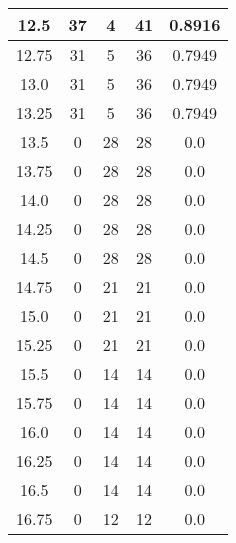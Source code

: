 \documentclass[letterpaper, 12pt]{article}
\begin{document}
\begin{longtable}{|c|c|c|c|c|}
12.5 & 37 & 4 & 41 & 0.8916 \\
\hline
12.75 & 31 & 5 & 36 & 0.7949 \\
\hline
13.0 & 31 & 5 & 36 & 0.7949 \\
\hline
13.25 & 31 & 5 & 36 & 0.7949 \\
\hline
13.5 & 0 & 28 & 28 & 0.0 \\
\hline
13.75 & 0 & 28 & 28 & 0.0 \\
\hline
14.0 & 0 & 28 & 28 & 0.0 \\
\hline
14.25 & 0 & 28 & 28 & 0.0 \\
\hline
14.5 & 0 & 28 & 28 & 0.0 \\
\hline
14.75 & 0 & 21 & 21 & 0.0 \\
\hline
15.0 & 0 & 21 & 21 & 0.0 \\
\hline
15.25 & 0 & 21 & 21 & 0.0 \\
\hline
15.5 & 0 & 14 & 14 & 0.0 \\
\hline
15.75 & 0 & 14 & 14 & 0.0 \\
\hline
16.0 & 0 & 14 & 14 & 0.0 \\
\hline
16.25 & 0 & 14 & 14 & 0.0 \\
\hline
16.5 & 0 & 14 & 14 & 0.0 \\
\hline
16.75 & 0 & 12 & 12 & 0.0 \\
\hline
\end{longtable}
\end{document}
